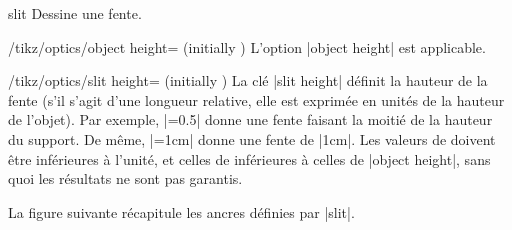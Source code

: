 \documentclass[a4paper]{ltxdoc}
\begin{document}
\begin{shape}{slit}
Dessine une fente.

\begin{codeexample}[width=6cm]
\end{codeexample}

\begin{key}{/tikz/optics/object height= (initially )}
    L'option |object height| est applicable.
\end{key}


\begin{key}{/tikz/optics/slit height= (initially )}
La clé |slit height| définit la hauteur de la fente (s'il s'agit d'une longueur relative, elle est exprimée en unités de la hauteur de l'objet). 
Par exemple, |=0.5| donne une fente faisant la moitié de la hauteur du support. De même, |=1cm| donne une fente de |1cm|. Les valeurs de  doivent être inférieures à l'unité, et celles de  inférieures à celles de |object height|, sans quoi les résultats ne sont pas garantis.

\begin{codeexample}[width=6cm]
\end{codeexample}
\end{key}

La figure suivante récapitule les ancres définies par |slit|.

\begin{codeexample}[]
\Huge
{}
\end{codeexample}

\end{shape}
\end{document}
